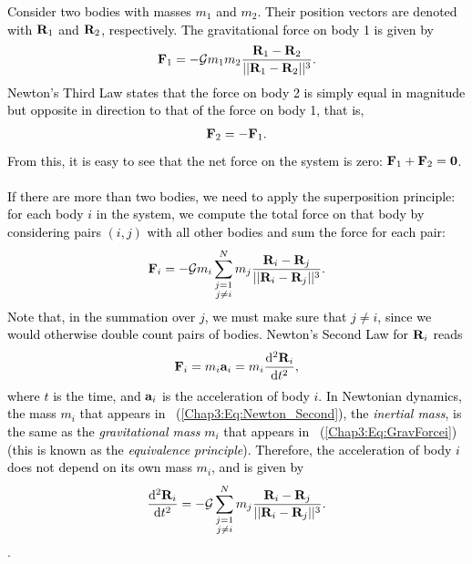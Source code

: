 \documentclass[main.tex]{subfiles}
\begin{document}
\begin{tcolorbox}[sharp corners, colback=blue!30, colframe=blue!80!blue, title=Box \refstepcounter{educhap3}\label{boxchap3:dynII}\ref{boxchap3:dynII} -- Orbital Dynamics II]
\par \textcolor{black}{Consider two bodies with masses $m_1$ and $m_2$. Their position vectors are denoted with ${\mathbf{R}}_1$ and ${\mathbf{R}}_2$, respectively. The gravitational force on body 1 is given by
\begin{align}
\label{Chap3:Eq:F_1_vec}
{\mathbf{F}}_{1} = - \mathcal{G} m_1m_2 \frac{{\mathbf{R}}_1 - {\mathbf{R}}_2}{|| {\mathbf{R}}_1 - {\mathbf{R}}_2||^3}.
\end{align}
 Newton's Third Law states that the force on body 2 is simply equal in magnitude but opposite in direction to that of the force on body 1, that is,
\begin{align}
{\mathbf{F}}_{2} = - {\mathbf{F}}_{1}.
\end{align}
From this, it is easy to see that the net force on the system is zero: ${\mathbf{F}}_1 + {\mathbf{F}}_2 = {\mathbf{0}}$. \\ \\
If there are more than two bodies, we need to apply the superposition principle: for each body $i$ in the system, we compute the total force on that body by considering pairs $(i,j)$ with all other bodies and sum the force for each pair:
\begin{align}
\label{Chap3:Eq:GravForcei}
{\mathbf{F}}_i = -\mathcal{G} m_i \sum_{\substack{j=1 \\ j\neq i}}^{N} m_j \frac{ {\mathbf{R}}_i - {\mathbf{R}}_j}{|| {\mathbf{R}}_i - {\mathbf{R}}_j||^3}.
\end{align}
Note that, in the summation over $j$, we must make sure that $j\neq i$, since we would otherwise double count pairs of bodies. Newton's Second Law for ${\mathbf{R}}_i$ reads
\begin{align}
\label{Chap3:Eq:Newton_Second}
{\mathbf{F}}_i = m_i {\mathbf{a}}_i = m_i \frac{\mathrm{d}^2 {\mathbf{R}}_i}{\mathrm{d} t^2},
\end{align}
where $t$ is the time, and ${\mathbf{a}}_i$ is the acceleration of body $i$. In Newtonian dynamics, the mass $m_i$ that appears in \Eq~(\ref{Chap3:Eq:Newton_Second}), the {\it inertial mass}, is the same as the {\it gravitational mass} $m_i$ that appears in \Eq~(\ref{Chap3:Eq:GravForcei}) (this is known as the {\it equivalence principle}). Therefore, the acceleration of body $i$ does not depend on its own mass $m_i$, and is given by
\begin{align}
\label{Chap3:Eq:EOM}
\frac{\mathrm{d}^2 {\mathbf{R}}_i}{\mathrm{d} t^2} = - \mathcal{G} \sum_{\substack{j=1 \\ j\neq i}}^{N} m_j \frac{ {\mathbf{R}}_i - {\mathbf{R}}_j}{|| {\mathbf{R}}_i - {\mathbf{R}}_j||^3}.
\end{align}
}.  
\end{tcolorbox}
\end{document}
